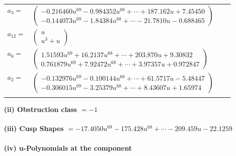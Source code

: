 \documentclass[1p]{elsarticle_modified}
\theoremstyle{definition}
\begin{document}
\begin{tabular}{m{7pt} m{180pt} m{7pt} m{180pt} }
\flushright $a_{3}=$&$\begin{pmatrix}-0.216460 u^{69}-0.984352 u^{68}+\cdots+187.162 u+7.45450\\-0.144073 u^{69}-1.84384 u^{68}+\cdots-21.7810 u-0.688465\end{pmatrix}$ \\
\flushright $a_{12}=$&$\begin{pmatrix}u\\u^3+u\end{pmatrix}$ \\
\flushright $a_{6}=$&$\begin{pmatrix}1.51593 u^{69}+16.2137 u^{68}+\cdots+203.870 u+9.30832\\0.761879 u^{69}+7.92472 u^{68}+\cdots+3.97357 u+0.972847\end{pmatrix}$ \\
\flushright $a_{2}=$&$\begin{pmatrix}-0.132976 u^{69}-0.100144 u^{68}+\cdots+61.5717 u-5.48447\\-0.306015 u^{69}-3.25379 u^{68}+\cdots+8.43607 u+1.65974\end{pmatrix}$\\&\end{tabular}
\flushleft \textbf{(ii) Obstruction class $= -1$}\\~\\
\flushleft \textbf{(iii) Cusp Shapes $= -17.4050 u^{69}-175.428 u^{68}+\cdots-209.459 u-22.1259$}\\~\\
\newpage\renewcommand{\arraystretch}{1}
\flushleft \textbf{(iv) u-Polynomials at the component}\newline \\
\end{document}
